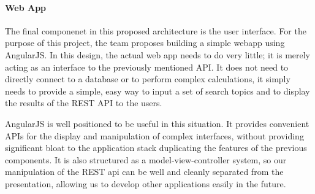 \paragraph{Web App}
The final componenet in this proposed architecture is the user
interface.
For the purpose of this project, the team proposes building a simple
webapp using AngularJS.
In this design, the actual web app needs to do very little; it is
merely acting as an interface to the previously mentioned API.
It does not need to directly connect to a database or to perform
complex calculations, it simply needs to provide a simple, easy way to
input a set of search topics and to display the results of the REST
API to the users.

AngularJS is well positioned to be useful in this situation.
It provides convenient APIs for the display and manipulation of
complex interfaces, without providing significant bloat to the
application stack duplicating the features of the previous components.
It is also structured as a model-view-controller system, so our
manipulation of the REST api can be well and cleanly separated from
the presentation, allowing us to develop other applications easily in
the future.  

